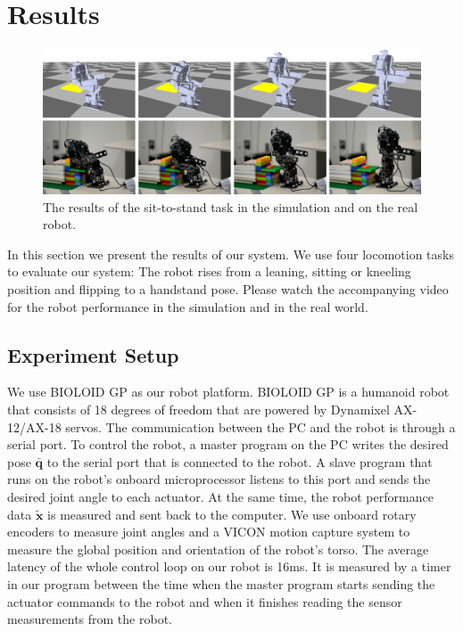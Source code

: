 \section{Results}

\begin{figure}[!t]
  \centering
  \includegraphics[width=\textwidth]{figures/sit2Stand}
  \caption{The results of the sit-to-stand task in the simulation and on the real robot.}
  \label{fig:sit2Stand}
\end{figure}

In this section we present the results of our system. We use four locomotion tasks to evaluate our system: The robot rises from a leaning, sitting or kneeling position and flipping to a handstand pose. Please watch the accompanying video for the robot performance in the simulation and in the real world.

\subsection{Experiment Setup}

We use BIOLOID GP as our robot platform. BIOLOID GP is a humanoid robot that consists of 18 degrees of freedom that are powered by Dynamixel AX-12/AX-18 servos. The communication between the PC and the robot is through a serial port. To control the robot, a master program on the PC writes the desired pose $\bar{\mathbf{q}}$ to the serial port that is connected to the robot. A slave program that runs on the robot's onboard microprocessor listens to this port and sends the desired joint angle to each actuator. At the same time, the robot performance data $\tilde{\mathbf{x}}$ is measured and sent back to the computer. We use onboard rotary encoders to measure joint angles and a VICON motion capture system to measure the global position and orientation of the robot's torso. The average latency of the whole control loop on our robot is 16ms. It is measured by a timer in our program between the time when the master program starts sending the actuator commands to the robot and when it finishes reading the sensor measurements from the robot.

